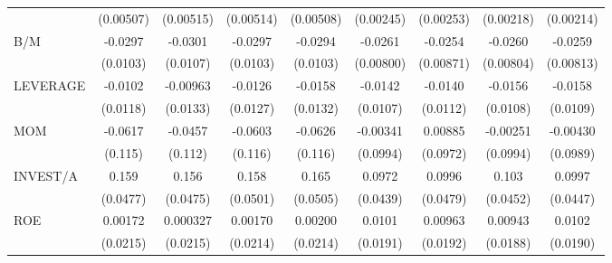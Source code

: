 \begin{table}[htbp]
\begin{tabular}{l*{8}{c}}
                    &   (0.00507)         &   (0.00515)         &   (0.00514)         &   (0.00508)         &   (0.00245)         &   (0.00253)         &   (0.00218)         &   (0.00214)         \\
B/M                 &     -0.0297\sym{***}&     -0.0301\sym{***}&     -0.0297\sym{***}&     -0.0294\sym{***}&     -0.0261\sym{***}&     -0.0254\sym{***}&     -0.0260\sym{***}&     -0.0259\sym{***}\\
                    &    (0.0103)         &    (0.0107)         &    (0.0103)         &    (0.0103)         &   (0.00800)         &   (0.00871)         &   (0.00804)         &   (0.00813)         \\
LEVERAGE            &     -0.0102         &    -0.00963         &     -0.0126         &     -0.0158         &     -0.0142         &     -0.0140         &     -0.0156         &     -0.0158         \\
                    &    (0.0118)         &    (0.0133)         &    (0.0127)         &    (0.0132)         &    (0.0107)         &    (0.0112)         &    (0.0108)         &    (0.0109)         \\
MOM                 &     -0.0617         &     -0.0457         &     -0.0603         &     -0.0626         &    -0.00341         &     0.00885         &    -0.00251         &    -0.00430         \\
                    &     (0.115)         &     (0.112)         &     (0.116)         &     (0.116)         &    (0.0994)         &    (0.0972)         &    (0.0994)         &    (0.0989)         \\
INVEST/A            &       0.159\sym{***}&       0.156\sym{***}&       0.158\sym{***}&       0.165\sym{***}&      0.0972\sym{**} &      0.0996\sym{**} &       0.103\sym{**} &      0.0997\sym{**} \\
                    &    (0.0477)         &    (0.0475)         &    (0.0501)         &    (0.0505)         &    (0.0439)         &    (0.0479)         &    (0.0452)         &    (0.0447)         \\
ROE                 &     0.00172         &    0.000327         &     0.00170         &     0.00200         &      0.0101         &     0.00963         &     0.00943         &      0.0102         \\
                    &    (0.0215)         &    (0.0215)         &    (0.0214)         &    (0.0214)         &    (0.0191)         &    (0.0192)         &    (0.0188)         &    (0.0190)         \\

\end{tabular}
\end{table}
